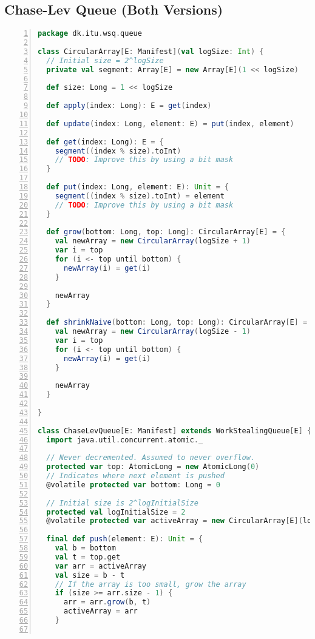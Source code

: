 \subsection{Chase-Lev Queue (Both Versions)}
\begin{lstlisting}[language=scala,basicstyle=\ttfamily\bfseries\scriptsize,numbers=left]
package dk.itu.wsq.queue

class CircularArray[E: Manifest](val logSize: Int) {
  // Initial size = 2^logSize
  private val segment: Array[E] = new Array[E](1 << logSize)

  def size: Long = 1 << logSize

  def apply(index: Long): E = get(index)

  def update(index: Long, element: E) = put(index, element)

  def get(index: Long): E = {
    segment((index % size).toInt)
    // TODO: Improve this by using a bit mask
  }

  def put(index: Long, element: E): Unit = {
    segment((index % size).toInt) = element
    // TODO: Improve this by using a bit mask
  }

  def grow(bottom: Long, top: Long): CircularArray[E] = {
    val newArray = new CircularArray(logSize + 1)
    var i = top
    for (i <- top until bottom) {
      newArray(i) = get(i)
    }

    newArray
  }

  def shrinkNaive(bottom: Long, top: Long): CircularArray[E] = {
    val newArray = new CircularArray(logSize - 1)
    var i = top
    for (i <- top until bottom) {
      newArray(i) = get(i)
    }

    newArray    
  }
  
}

class ChaseLevQueue[E: Manifest] extends WorkStealingQueue[E] {
  import java.util.concurrent.atomic._
  
  // Never decremented. Assumed to never overflow.
  protected var top: AtomicLong = new AtomicLong(0)
  // Indicates where next element is pushed
  @volatile protected var bottom: Long = 0
  
  // Initial size is 2^logInitialSize
  protected val logInitialSize = 2
  @volatile protected var activeArray = new CircularArray[E](logInitialSize)

  final def push(element: E): Unit = {
    val b = bottom
    val t = top.get
    var arr = activeArray
    val size = b - t
    // If the array is too small, grow the array
    if (size >= arr.size - 1) {
      arr = arr.grow(b, t)
      activeArray = arr
    }


\end{lstlisting}
